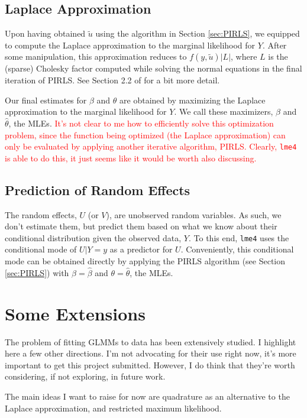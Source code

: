\documentclass{article}
\begin{document}
\subsection{Laplace Approximation}

Upon having obtained $\tilde{u}$ using the algorithm in Section \ref{sec:PIRLS}, we equipped to compute the Laplace approximation to the marginal likelihood for $Y$. After some manipulation, this approximation reduces to $f(y, \tilde{u}) |L|$, where $L$ is the (sparse) Cholesky factor computed while solving the normal equations in the final iteration of PIRLS. See Section 2.2 of \citet{Wal24} for a bit more detail.

Our final estimates for $\beta$ and $\theta$ are obtained by maximizing the Laplace approximation to the marginal likelihood for $Y$. We call these maximizers, $\hat{\beta}$ and $\hat{\theta}$, the MLEs. \textcolor{red}{It's not clear to me how to efficiently solve this optimization problem, since the function being optimized (the Laplace approximation) can only be evaluated by applying another iterative algorithm, PIRLS. Clearly, \texttt{lme4} is able to do this, it just seems like it would be worth also discussing.}

\subsection{Prediction of Random Effects}

The random effects, $U$ (or $V$), are unobserved random variables. As such, we don't estimate them, but predict them based on what we know about their conditional distribution given the observed data, $Y$. To this end, \texttt{lme4} uses the conditional mode of $U | Y=y$ as a predictor for $U$. Conveniently, this conditional mode can be obtained directly by applying the PIRLS algorithm (see Section \ref{sec:PIRLS}) with $\beta = \hat{\beta}$ and $\theta = \hat{\theta}$, the MLEs.


\section{Some Extensions}

The problem of fitting GLMMs to data has been extensively studied. I highlight here a few other directions. I'm not advocating for their use right now, it's more important to get this project submitted. However, I do think that they're worth considering, if not exploring, in future work.

The main ideas I want to raise for now are quadrature as an alternative to the Laplace approximation, and restricted maximum likelihood.
\end{document}
